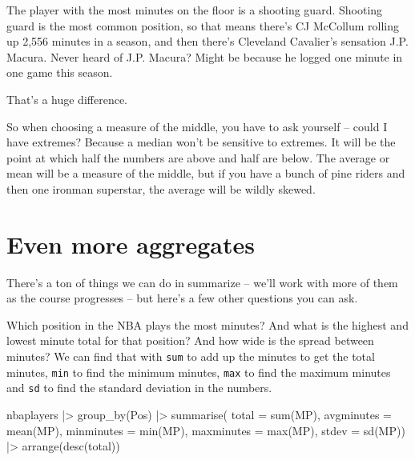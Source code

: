 \documentclass[
  letterpaper,
  DIV=11,
  numbers=noendperiod]{scrreprt}
\newenvironment{Shaded}{\begin{snugshade}}{\end{snugshade}}
\newcommand{\AttributeTok}[1]{\textcolor[rgb]{0.40,0.45,0.13}{#1}}
\newcommand{\FunctionTok}[1]{\textcolor[rgb]{0.28,0.35,0.67}{#1}}
\newcommand{\NormalTok}[1]{\textcolor[rgb]{0.00,0.23,0.31}{#1}}
\newcommand{\SpecialCharTok}[1]{\textcolor[rgb]{0.37,0.37,0.37}{#1}}
\begin{document}
The player with the most minutes on the floor is a shooting guard.
Shooting guard is the most common position, so that means there's CJ
McCollum rolling up 2,556 minutes in a season, and then there's
Cleveland Cavalier's sensation J.P. Macura. Never heard of J.P. Macura?
Might be because he logged one minute in one game this season.

That's a huge difference.

So when choosing a measure of the middle, you have to ask yourself --
could I have extremes? Because a median won't be sensitive to extremes.
It will be the point at which half the numbers are above and half are
below. The average or mean will be a measure of the middle, but if you
have a bunch of pine riders and then one ironman superstar, the average
will be wildly skewed.

\hypertarget{even-more-aggregates}{%
\section{Even more aggregates}\label{even-more-aggregates}}

There's a ton of things we can do in summarize -- we'll work with more
of them as the course progresses -- but here's a few other questions you
can ask.

Which position in the NBA plays the most minutes? And what is the
highest and lowest minute total for that position? And how wide is the
spread between minutes? We can find that with \texttt{sum} to add up the
minutes to get the total minutes, \texttt{min} to find the minimum
minutes, \texttt{max} to find the maximum minutes and \texttt{sd} to
find the standard deviation in the numbers.

\begin{Shaded}
\begin{Highlighting}[]
\NormalTok{nbaplayers }\SpecialCharTok{|\textgreater{}} 
  \FunctionTok{group\_by}\NormalTok{(Pos) }\SpecialCharTok{|\textgreater{}} 
  \FunctionTok{summarise}\NormalTok{(}
    \AttributeTok{total =} \FunctionTok{sum}\NormalTok{(MP), }
    \AttributeTok{avgminutes =} \FunctionTok{mean}\NormalTok{(MP), }
    \AttributeTok{minminutes =} \FunctionTok{min}\NormalTok{(MP),}
    \AttributeTok{maxminutes =} \FunctionTok{max}\NormalTok{(MP),}
    \AttributeTok{stdev =} \FunctionTok{sd}\NormalTok{(MP)) }\SpecialCharTok{|\textgreater{}} \FunctionTok{arrange}\NormalTok{(}\FunctionTok{desc}\NormalTok{(total))}
\end{Highlighting}
\end{Shaded}
\end{document}
